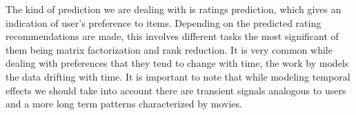   The kind of prediction we are dealing with is ratings prediction, which gives
an indication of user's preference to items. Depending on the predicted rating
recommendations are made, this involves different tasks the most significant of
them being matrix factorization and rank reduction. It is very common while
dealing with preferences that they tend to change with time, the work by
\cite{Koren:2010:CFT:1721654.1721677} models the data drifting with time. It is
important to note that while modeling temporal effects we should take into
account there are transient signals analogous to users and a more long term
patterns characterized by movies.


